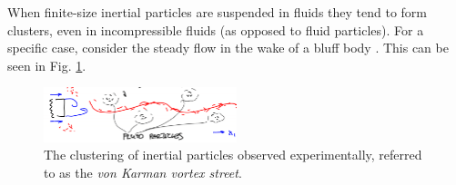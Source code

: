 \begin{ex}
	When finite-size inertial particles are suspended in fluids they tend to form clusters, even in incompressible fluids (as opposed to fluid particles). For a specific case, consider the steady flow in the wake of a bluff body \cite{Burns1999}. This can be seen in Fig. \ref{fig:vortex_street}.
\begin{figure}[h!]
	\centering
	\includegraphics[width=0.5\textwidth]{figures/ch9/20vortex_street.png}
	\caption{The clustering of inertial particles observed experimentally, referred to as the \emph{von Karman vortex street}.}
	\label{fig:vortex_street}
\end{figure}


\end{ex}
